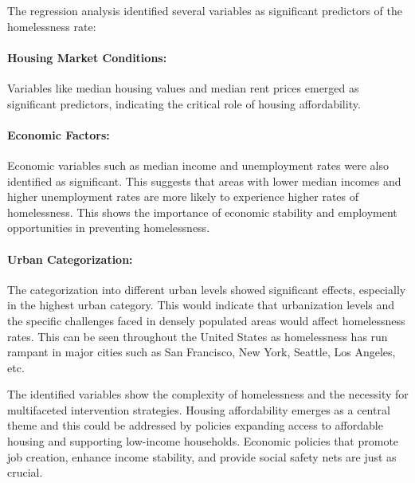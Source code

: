 \documentclass[12pt]{article}
\begin{document}
The regression analysis identified several variables as significant predictors of the homelessness rate:

\paragraph{Housing Market Conditions:} Variables like median housing values and median rent prices emerged as significant predictors, indicating the critical role of housing affordability. 

\paragraph{Economic Factors:} Economic variables such as median income and unemployment rates were also identified as significant. This suggests that areas with lower median incomes and higher unemployment rates are more likely to experience higher rates of homelessness. This shows the importance of economic stability and employment opportunities in preventing homelessness.

\paragraph{Urban Categorization:} The categorization into different urban levels showed significant effects, especially in the highest urban category. This would indicate that urbanization levels and the specific challenges faced in densely populated areas would affect homelessness rates. This can be seen throughout the United States as homelessness has run rampant in major cities such as San Francisco, New York, Seattle, Los Angeles, etc.

\bigskip The identified variables show the complexity of homelessness and the necessity for multifaceted intervention strategies. Housing affordability emerges as a central theme and this could be addressed by policies expanding access to affordable housing and supporting low-income households. Economic policies that promote job creation, enhance income stability, and provide social safety nets are just as crucial. 
\end{document}
